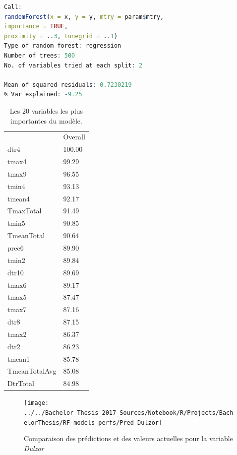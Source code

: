 \begin{minipage}{\linewidth}
	
	\begin{lstlisting}[showstringspaces=false,language=R, caption={Test du modèle de classification},captionpos=b]
Call:
randomForest(x = x, y = y, mtry = param$mtry, 
importance = TRUE,      
proximity = ..3, tunegrid = ..1) 
Type of random forest: regression
Number of trees: 500
No. of variables tried at each split: 2

Mean of squared residuals: 0.7230219
% Var explained: -9.25
	\end{lstlisting}
\end{minipage}


\begin{table}[H]
	\centering
	\caption{Les 20 variables les plus importantes du modèle.}
	\label{RF_Dulzor_Varimp}
	\begin{tabular}{ll}
              & Overall \\
dtr4          & 100.00  \\
tmax4         & 99.29   \\
tmax9         & 96.55   \\
tmin4         & 93.13   \\
tmean4        & 92.17   \\
TmaxTotal     & 91.49   \\
tmin5         & 90.85   \\
TmeanTotal    & 90.64   \\
prec6         & 89.90   \\
tmin2         & 89.84   \\
dtr10         & 89.69   \\
tmax6         & 89.17   \\
tmax5         & 87.47   \\
tmax7         & 87.16   \\
dtr8          & 87.15   \\
tmax2         & 86.37   \\
dtr2          & 86.23   \\
tmean1        & 85.78   \\
TmeanTotalAvg & 85.08   \\
DtrTotal      & 84.98
	\end{tabular}
\end{table}


\begin{figure}[H]
	\centering
	\texttt{[image: ../../Bachelor\_Thesis\_2017\_Sources/Notebook/R/Projects/BachelorThesis/RF\_models\_perfs/Pred\_Dulzor]}
	\caption{Comparaison des prédictions et des valeurs actuelles pour la variable \textit{Dulzor}}
	\label{fig:preddulzor}
\end{figure}


